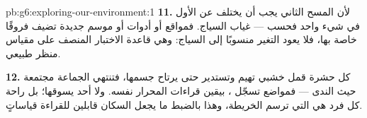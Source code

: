 \begin{solution}{pb:g6:exploring-our-environment:1}
\textbf{11.} لأن المسح الثاني يجب أن يختلف عن الأول في شيء واحد
فحسب --- غياب السياج. فمواقع أو أدوات أو موسم جديدة تضيف فروقًا
خاصة بها، فلا يعود التغير منسوبًا إلى السياج: وهي قاعدة الاختبار
المنصف على مقياس منظر طبيعي.

\textbf{12.} كل حشرة قمل خشبي تهيم وتستدير حتى يرتاح جسمها، فتنتهي
الجماعة مجتمعة حيث الندى --- فمواضع  تسجّل ، بيقين
قراءات المحرار نفسه. ولا أحد يسوقها؛ بل راحة كل فرد هي التي ترسم
الخريطة، وهذا بالضبط ما يجعل السكان قابلين للقراءة قياساتٍ.
\end{solution}

